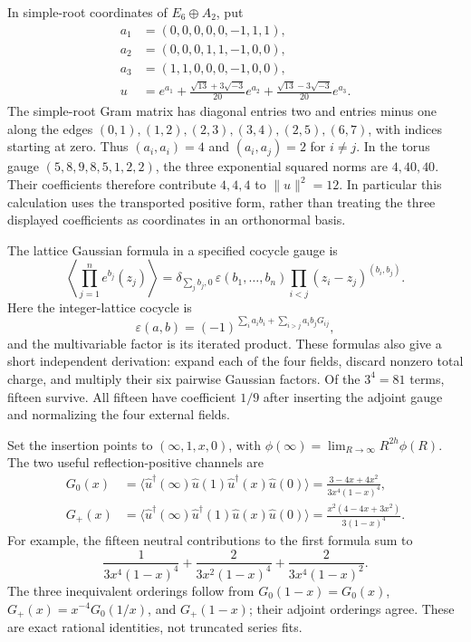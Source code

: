 \documentclass[11pt,a4paper]{article}
\theoremstyle{definition}
\begin{document}
In simple-root coordinates of $E_6\oplus A_2$, put
\begin{align}
 a_1&=(0,0,0,0,0,-1,1,1),\\
 a_2&=(0,0,0,1,1,-1,0,0),\\
 a_3&=(1,1,0,0,0,-1,0,0),\\
 u&=e^{a_1}+\frac{\sqrt{13}+3\sqrt{-3}}{20}e^{a_2}
             +\frac{\sqrt{13}-3\sqrt{-3}}{20}e^{a_3}.
\end{align}
The simple-root Gram matrix has diagonal entries two and entries minus
one along the edges $(0,1),(1,2),(2,3),(3,4),(2,5),(6,7)$, with indices
starting at zero.  Thus $(a_i,a_i)=4$ and $(a_i,a_j)=2$ for $i\ne j$.
In the torus gauge $(5,8,9,8,5,1,2,2)$, the three exponential squared
norms are $4,40,40$.  Their coefficients therefore contribute $4,4,4$
to $\|u\|^2=12$.  In particular this calculation uses the transported
positive form, rather than treating the three displayed coefficients as
coordinates in an orthonormal basis.

The lattice Gaussian formula in a specified cocycle gauge is
\begin{equation}
 \left\langle\prod_{j=1}^{n}e^{b_j}(z_j)\right\rangle
 =\delta_{\sum_j b_j,0}\,
   \varepsilon(b_1,\ldots,b_n)
   \prod_{i<j}(z_i-z_j)^{(b_i,b_j)}.
\end{equation}
Here the integer-lattice cocycle is
\begin{equation}
 \varepsilon(a,b)=(-1)^{\sum_i a_i b_i+
                  \sum_{i>j}a_i b_jG_{ij}},
\end{equation}
and the multivariable factor is its iterated product.  These formulas
also give a short independent derivation: expand each of the four
fields, discard nonzero total charge, and multiply their six pairwise
Gaussian factors.  Of the $3^4=81$ terms, fifteen survive.  All fifteen
have coefficient $1/9$ after inserting the adjoint gauge and normalizing
the four external fields.

Set the insertion points to $(\infty,1,x,0)$, with
$\phi(\infty)=\lim_{R\to\infty}R^{2h}\phi(R)$.  The two useful
reflection-positive channels are
\begin{align}
 G_0(x)&=\langle\widehat u^\dagger(\infty)\widehat u(1)
                 \widehat u^\dagger(x)\widehat u(0)\rangle
       =\boxed{\frac{3-4x+4x^2}{3x^4(1-x)^4}},
       \label{eq:physics-u-neutral}\\
 G_+(x)&=\langle\widehat u^\dagger(\infty)\widehat u^\dagger(1)
                 \widehat u(x)\widehat u(0)\rangle
       =\boxed{\frac{x^2(4-4x+3x^2)}{3(1-x)^4}}.
       \label{eq:physics-u-charged}
\end{align}
For example, the fifteen neutral contributions to the first formula
sum to
\begin{equation}
 \frac{1}{3x^4(1-x)^4}
 +\frac{2}{3x^2(1-x)^4}
 +\frac{2}{3x^4(1-x)^2}.
\end{equation}
The three inequivalent orderings follow from
$G_0(1-x)=G_0(x)$,
$G_+(x)=x^{-4}G_0(1/x)$, and $G_+(1-x)$; their adjoint orderings agree.
These are exact rational identities, not truncated series fits.
\end{document}
